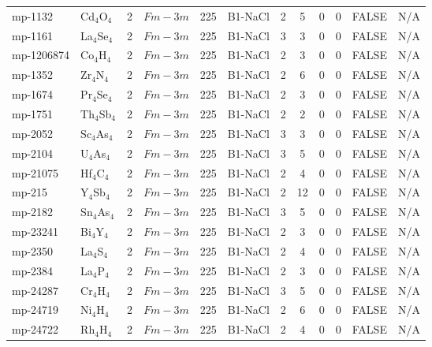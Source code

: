 {\begin{longtable}{llcccccccccc}
    mp-1132 & Cd$_{4}$O$_{4}$ & 2     & $Fm-3m$ & 225   & B1-NaCl & 2     & 5     & 0     & 0     & FALSE & N/A \\
    mp-1161 & La$_{4}$Se$_{4}$ & 2     & $Fm-3m$ & 225   & B1-NaCl & 3     & 3     & 0     & 0     & FALSE & N/A \\
    mp-1206874 & Co$_{4}$H$_{4}$ & 2     & $Fm-3m$ & 225   & B1-NaCl & 2     & 3     & 0     & 0     & FALSE & N/A \\
    mp-1352 & Zr$_{4}$N$_{4}$ & 2     & $Fm-3m$ & 225   & B1-NaCl & 2     & 6     & 0     & 0     & FALSE & N/A \\
    mp-1674 & Pr$_{4}$Se$_{4}$ & 2     & $Fm-3m$ & 225   & B1-NaCl & 2     & 3     & 0     & 0     & FALSE & N/A \\
    mp-1751 & Th$_{4}$Sb$_{4}$ & 2     & $Fm-3m$ & 225   & B1-NaCl & 2     & 2     & 0     & 0     & FALSE & N/A \\
    mp-2052 & Sc$_{4}$As$_{4}$ & 2     & $Fm-3m$ & 225   & B1-NaCl & 3     & 3     & 0     & 0     & FALSE & N/A \\
    mp-2104 & U$_{4}$As$_{4}$ & 2     & $Fm-3m$ & 225   & B1-NaCl & 3     & 5     & 0     & 0     & FALSE & N/A \\
    mp-21075 & Hf$_{4}$C$_{4}$ & 2     & $Fm-3m$ & 225   & B1-NaCl & 2     & 4     & 0     & 0     & FALSE & N/A \\
    mp-215 & Y$_{4}$Sb$_{4}$ & 2     & $Fm-3m$ & 225   & B1-NaCl & 2     & 12    & 0     & 0     & FALSE & N/A \\
    mp-2182 & Sn$_{4}$As$_{4}$ & 2     & $Fm-3m$ & 225   & B1-NaCl & 3     & 5     & 0     & 0     & FALSE & N/A \\
    mp-23241 & Bi$_{4}$Y$_{4}$ & 2     & $Fm-3m$ & 225   & B1-NaCl & 2     & 3     & 0     & 0     & FALSE & N/A \\
    mp-2350 & La$_{4}$S$_{4}$ & 2     & $Fm-3m$ & 225   & B1-NaCl & 2     & 4     & 0     & 0     & FALSE & N/A \\
    mp-2384 & La$_{4}$P$_{4}$ & 2     & $Fm-3m$ & 225   & B1-NaCl & 2     & 3     & 0     & 0     & FALSE & N/A \\
    mp-24287 & Cr$_{4}$H$_{4}$ & 2     & $Fm-3m$ & 225   & B1-NaCl & 3     & 5     & 0     & 0     & FALSE & N/A \\
    mp-24719 & Ni$_{4}$H$_{4}$ & 2     & $Fm-3m$ & 225   & B1-NaCl & 2     & 6     & 0     & 0     & FALSE & N/A \\
    mp-24722 & Rh$_{4}$H$_{4}$ & 2     & $Fm-3m$ & 225   & B1-NaCl & 2     & 4     & 0     & 0     & FALSE & N/A \\

\end{longtable}}
